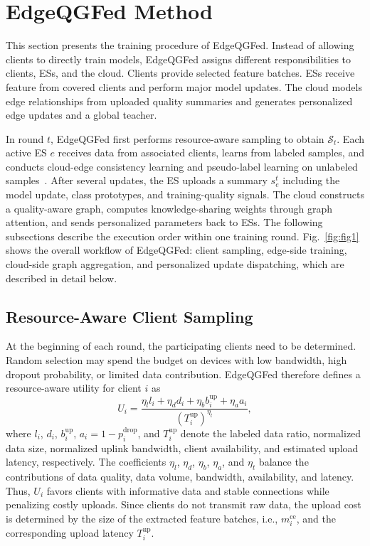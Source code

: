 ﻿\documentclass[10pt, conference, letterpaper]{ IEEEtran}
\begin{document}
\section{EdgeQGFed Method}
\label{sec:method}
This section presents the training procedure of EdgeQGFed. Instead of allowing clients to directly train models, EdgeQGFed assigns different responsibilities to clients, ESs, and the cloud. Clients provide selected feature batches. ESs receive feature from covered clients and perform major model updates. The cloud models edge relationships from uploaded quality summaries and generates personalized edge updates and a global teacher.

In round $t$, EdgeQGFed first performs resource-aware sampling to obtain $\mathcal{S}_t$. Each active ES $e$ receives data from associated clients, learns from labeled samples, and conducts cloud-edge consistency learning and pseudo-label learning on unlabeled samples~\cite{Hu2026FedGDS, li2026towards}. After several updates, the ES uploads a summary $s_e^t$ including the model update, class prototypes, and training-quality signals. The cloud constructs a quality-aware graph, computes knowledge-sharing weights through graph attention, and sends personalized parameters back to ESs. The following subsections describe the execution order within one training round. Fig.~\ref{fig:fig1} shows the overall workflow of EdgeQGFed: client sampling, edge-side training, cloud-side graph aggregation, and personalized update dispatching, which are described in detail below.

\subsection{Resource-Aware Client Sampling}
\label{subsec:sampling}
At the beginning of each round, the participating clients need to be determined. Random selection may spend the budget on devices with low bandwidth, high dropout probability, or limited data contribution. EdgeQGFed therefore defines a resource-aware utility for client $i$ as
\begin{equation}
    U_i =
    \frac{
    \eta_l l_i + \eta_d d_i + \eta_b b_i^{\mathrm{up}} + \eta_a a_i
    }
    {(T_i^{\mathrm{up}})^{\eta_t}},
    \label{eq:client_utility}
\end{equation}
where $l_i$, $d_i$, $b_i^{\mathrm{up}}$, $a_i=1-p_i^{\mathrm{drop}}$, and $T_i^{\mathrm{up}}$ denote the labeled data ratio, normalized data size, normalized uplink bandwidth, client availability, and estimated upload latency, respectively. The coefficients $\eta_l$, $\eta_d$, $\eta_b$, $\eta_a$, and $\eta_t$ balance the contributions of data quality, data volume, bandwidth, availability, and latency. Thus, $U_i$ favors clients with informative data and stable connections while penalizing costly uploads. Since clients do not transmit raw data, the upload cost is determined by the size of the extracted feature batches, i.e., $m_i^{\mathrm{ce}}$, and the corresponding upload latency $T_i^{\mathrm{up}}$.
\end{document}
